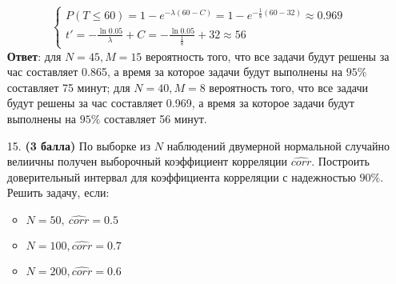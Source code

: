 \documentclass{assignment}
\begin{document}
\begin{enumerate}
\begin{equation}
\begin{cases}
            P(T\leq 60)=1 - e^{-\lambda (60-C)} = 1 - e^{-\frac{1}{8} (60-32)} \approx 0.969 \\
            t' = -\frac{\ln 0.05}{\lambda} + C = -\frac{\ln 0.05}{\frac{1}{8}} + 32 \approx 56
        \end{cases}
    \end{equation}
    \textbf{Ответ}: для $N = 45, M = 15$ вероятность того, что все задачи будут решены за час составляет 0.865, а время за которое задачи будут выполнены на $95\%$ составляет 75 минут; для $N = 40, M = 8$ вероятность того, что все задачи будут решены за час составляет 0.969, а время за которое задачи будут выполнены на $95\%$ составляет 56 минут.
    \finish




    \item[15.] \textbf{(3 балла)} По выборке из $N$ наблюдений двумерной нормальной случайно велиичны получен выборочный коэффициент корреляции $\hat{corr}$. Построить доверительный интервал для коэффициента корреляции с надежностью $90\%$. Решить задачу, если: 

    \begin{itemize}
        \item $N = 50,~ \hat{corr} = 0.5$
        \item $N = 100, \hat{corr} = 0.7$
        \item $N = 200, \hat{corr} = 0.6$


\end{itemize}
\end{enumerate}
\end{document}

